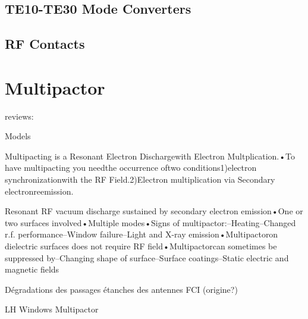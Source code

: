 \subsection{TE10-TE30 Mode Converters}\label{sec:mode_converter}


\subsection{RF Contacts}\label{sec:RF_contacts}




\section{Multipactor}\label{sec:Multipactor}
reviews:\cite{kishek1998}

Models\cite{vaughan1989}

Multipacting is a Resonant Electron Dischargewith Electron Multplication.•To have multipacting you needthe occurrence oftwo conditions1)electron synchronizationwith the RF Field.2)Electron multiplication via Secondary electronreemission.

Resonant RF vacuum discharge sustained by secondary electron emission•One or two surfaces involved•Multiple modes•Signs of multipactor:–Heating–Changed r.f. performance–Window failure–Light and X-ray emission•Multipactoron dielectric surfaces does not require RF field•Multipactorcan sometimes be suppressed by–Changing shape of surface–Surface coatings–Static electric and magnetic fields

Dégradations des passages étanches des antennes FCI (origine?)



LH Windows Multipactor



